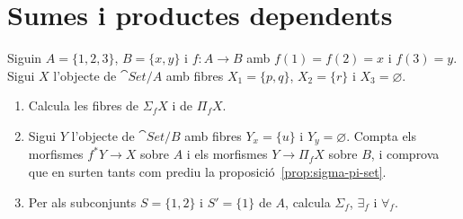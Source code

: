 \section{Sumes i productes dependents}

\begin{exercici}\label{pr-sigma-pi}
Siguin $A=\{1,2,3\}$, $B=\{x,y\}$ i $f\colon A\to B$ amb $f(1)=f(2)=x$ i $f(3)=y$. Sigui $X$ l'objecte de $\cat{Set}/A$ amb fibres $X_1=\{p,q\}$, $X_2=\{r\}$ i $X_3=\varnothing$.
\begin{enumerate}
\item Calcula les fibres de $\Sigma_f X$ i de $\Pi_f X$.
\item Sigui $Y$ l'objecte de $\cat{Set}/B$ amb fibres $Y_x=\{u\}$ i $Y_y=\varnothing$. Compta els morfismes $f^{*}Y\to X$ sobre $A$ i els morfismes $Y\to\Pi_f X$ sobre $B$, i comprova que en surten tants com prediu la proposició~\ref{prop:sigma-pi-set}.
\item Per als subconjunts $S=\{1,2\}$ i $S'=\{1\}$ de $A$, calcula $\Sigma_f$, $\exists_f$ i $\forall_f$.
\end{enumerate}
\end{exercici}


